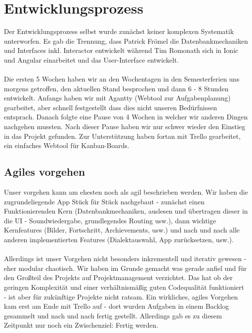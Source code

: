 
\section{Entwicklungsprozess}
Der Entwicklungsprozess selbst wurde zunächst keiner komplexen Systematik unterworfen. Es gab die Trennung, dass Patrick Frömel die Datenbankmechaniken und Interfaces inkl. Interactor entwickelt während Tim Romonath sich in Ionic und Angular einarbeitet und das User-Interface entwickelt.\\\\Die ersten 5 Wochen haben wir an den Wochentagen in den Semesterferien uns morgens getroffen, den aktuellen Stand besprochen und dann 6 - 8 Stunden entwickelt. Anfangs haben wir mit Agantty (Webtool zur Aufgabenplanung) gearbeitet, aber schnell festgestellt dass dies nicht unseren Bedürfnissen entsprach. Danach folgte eine Pause von 4 Wochen in welcher wir anderen Dingen nachgehen mussten. Nach dieser Pause haben wir nur schwer wieder den Einstieg in das Projekt gefunden. Zur Unterstützung haben fortan mit Trello gearbeitet, ein einfaches Webtool für Kanban-Boards.

\subsection{Agiles vorgehen}
Unser vorgehen kann am ehesten noch als \glqq agil\grqq{} beschrieben werden. Wir haben die zugrundeliegende App Stück für Stück nachgebaut - zunächst einen Funktionierenden Kern (Datenbankmechaniken, auslesen und übertragen dieser in die UI - Soundwiedergabe, grundlegendes Routing usw.), dann wichtige Kernfeatures (Bilder, Fortschritt, Archievements, usw.) und nach und nach alle anderen implementierten Features (Dialektauswahl, App zurücksetzen, usw.). \\\\Allerdings ist unser Vorgehen nicht besonders inkrementell und iterativ gewesen - eher modular chaotisch. Wir haben im Grunde gemacht was gerade anfiel und für den Großteil des Projekts auf Projektmanagement verzichtet. Das hat ob der geringen Komplexität und einer verhältnismäßig guten Codequalität funktioniert - ist aber für zukünftige Projekte nicht ratsam. Ein wirkliches, agiles Vorgehen kam erst am Ende mit Trello auf - dort wurden Aufgaben in einem Backlog gesammelt und nach und nach fertig gestellt. Allerdings gab es zu diesem Zeitpunkt nur noch ein Zwischenziel: Fertig werden.

